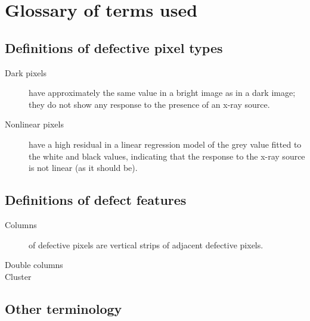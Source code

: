 \documentclass[\main/IO-Pixels.tex]{subfiles}
\begin{document}
\section{Glossary of terms used}

\subsection{Definitions of defective pixel types}


\begin{description}

\item[Dark pixels] have approximately the same value in a bright image as in a dark image; they do not show any response to the presence of an x-ray source.

\item[Nonlinear pixels] have a high residual in a linear regression model of the grey value fitted to the white and black values, indicating that the response to the x-ray source is not linear (as it should be).

\end{description}


\subsection{Definitions of defect features}

\begin{description}

\item[Columns] of defective pixels are vertical strips of adjacent defective pixels.

\item[Double columns]

\item[Cluster] 
 
\end{description}


\subsection{Other terminology}
\end{document}
